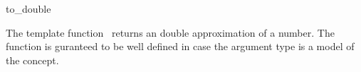 \begin{ccRefFunction}{to_double}

\ccDefinition

The template function \ccRefName\ returns an double approximation of a number. 
The function is guranteed to be well defined in case the argument type 
is a model of the  concept. 


{}

\ccSeeAlso

\\
\\

\end{ccRefFunction}
